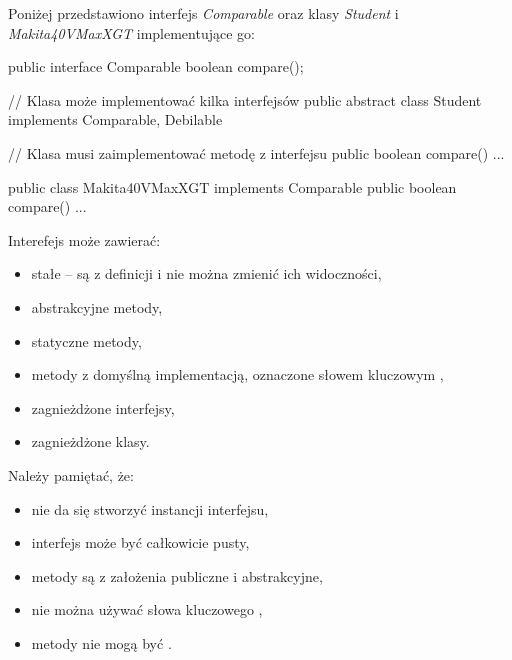 \begin{example}
    Poniżej przedstawiono interfejs \textit{Comparable} oraz klasy \textit{Student} i \textit{Makita40VMaxXGT} implementujące go:
    \begin{java}
        public interface Comparable {
            boolean compare();
        }

        // Klasa może implementować kilka interfejsów
        public abstract class Student implements Comparable, Debilable {

            // Klasa musi zaimplementować metodę z interfejsu
            public boolean compare() { ... }
        }
    
        public class Makita40VMaxXGT implements Comparable {
            public boolean compare() { ... }
        }
\end{java}
\end{example}

Interefejs może zawierać:
\begin{itemize}
    \item stałe -- są z definicji  i nie można zmienić ich widoczności,
    \item abstrakcyjne metody,
    \item statyczne metody,
    \item metody z domyślną implementacją, oznaczone słowem kluczowym ,
    \item zagnieżdżone interfejsy,
    \item zagnieżdżone klasy.
\end{itemize}

Należy pamiętać, że:
\begin{itemize}
    \item nie da się stworzyć instancji interfejsu,
    \item interfejs może być całkowicie pusty,
    \item metody są z założenia publiczne i abstrakcyjne,
    \item nie można używać słowa kluczowego ,
    \item metody nie mogą być .
\end{itemize}

